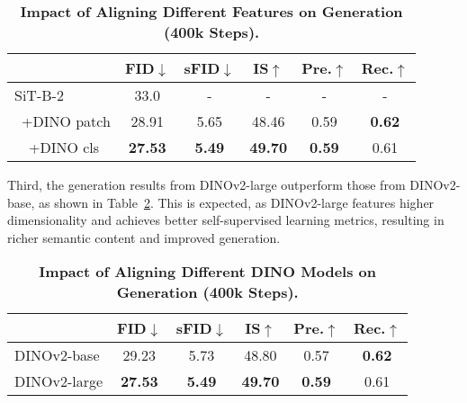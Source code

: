 \begin{table}[ht]
\vskip -0.1in
\caption{\textbf{Impact of Aligning Different Features on Generation (400k Steps).}}
\centering
\small %
\begin{tabular}{l|ccccc}
\toprule
                                   & FID$\downarrow$ &  sFID$\downarrow$ & IS$\uparrow$ & Pre.$\uparrow$ & Rec.$\uparrow$ \\ \midrule
SiT-B-2                            & 33.0            & -                   & -            & -                   & -                \\
\  +DINO patch              & 28.91           & 5.65                & 48.46        & 0.59                & \textbf{0.62}             \\
\  \  +DINO cls & \textbf{27.53}           & \textbf{5.49}                & \textbf{49.70}        & \textbf{0.59}                & 0.61             \\ \bottomrule
\end{tabular}
\label{Ablation 1}
\vskip -0.1in
\end{table}

Third, the generation results from DINOv2-large outperform those from DINOv2-base, as shown in Table~\ref{Ablation 2}. This is expected, as DINOv2-large features higher dimensionality and achieves better self-supervised learning metrics, resulting in richer semantic content and improved generation.


\begin{table}[ht]
\centering
\small
\vskip -0.1in
\caption{\textbf{Impact of Aligning Different DINO Models on Generation (400k Steps).}}
\begin{tabular}{l|ccccc}
\toprule
  & FID$\downarrow$ & sFID$\downarrow$ & IS$\uparrow$ & Pre.$\uparrow$ & Rec.$\uparrow$ \\ \midrule
\multicolumn{1}{l|}{DINOv2-base} & 29.23           & 5.73             & 48.80        & 0.57                & \textbf{0.62}             \\
\multicolumn{1}{l|}{DINOv2-large} & \textbf{27.53}           & \textbf{5.49}             & \textbf{49.70}        & \textbf{0.59}                & 0.61             \\ 
\bottomrule
\end{tabular}
\label{Ablation 2}
\vspace{-1em}
\end{table}

